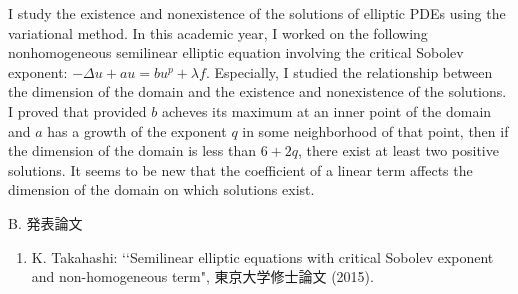 \documentclass[a4j,twocolumn]{jarticle}
\begin{document}
\vspace{0.5cm}

I study the existence and nonexistence of the solutions
of elliptic PDEs using the variational method.
In this academic year, I worked on the following
nonhomogeneous semilinear elliptic equation
involving the critical Sobolev exponent:
$-\Delta u + a u = b u^p + \lambda f$. Especially, I studied
the relationship between the dimension of the domain and
the existence and nonexistence of the solutions.
I proved that provided 
$b$ acheves its maximum at an inner point of the
domain and $a$ has a growth of the exponent $q$
in some neighborhood of that point, then
if the dimension of the domain is less than $6 + 2q$,
there exist at least two positive solutions.
It seems to be new that the coefficient of a linear term affects
the dimension of the domain on which solutions exist.

\vspace{0.2cm}


\noindent
B. 発表論文

\vspace{0.1cm}

\begin{enumerate}
\item K. Takahashi: \lq\lq Semilinear elliptic equations with critical
      Sobolev exponent and non-homogeneous term",
      東京大学修士論文 (2015).
\end{enumerate}
\end{document}
